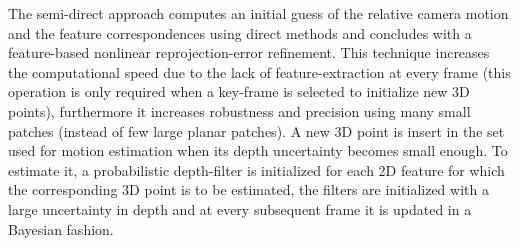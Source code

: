 


The semi-direct approach computes an initial guess of the relative camera motion and the feature correspondences using direct methods and concludes with a feature-based nonlinear reprojection-error refinement. This technique increases the computational speed due to the lack of feature-extraction at every frame (this operation is only required when a key-frame is selected to initialize new 3D points), furthermore it increases robustness and precision using many small patches (instead of few large planar patches).
A new 3D point is insert in the set used for motion estimation when its depth uncertainty becomes small enough. To estimate it, a probabilistic depth-filter is initialized for each 2D feature for which the corresponding 3D point is to be estimated, the filters are initialized with a large uncertainty in depth and at every subsequent frame it is updated in a Bayesian fashion.


